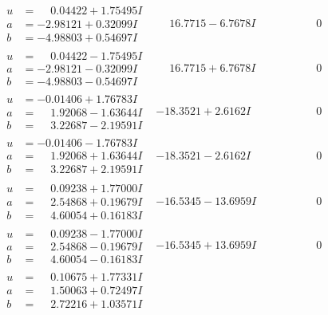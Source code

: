 \documentclass[1p]{elsarticle_modified}
\theoremstyle{definition}
\begin{document}
$$\begin{array}{c|c|c}
\begin{aligned}
u &= \phantom{-}0.04422 + 1.75495 I \\
a &= -2.98121 + 0.32099 I \\
b &= -4.98803 + 0.54697 I\end{aligned}
 & \phantom{-}16.7715 - 6.7678 I & \phantom{-0.000000 } 0 \\ \hline\begin{aligned}
u &= \phantom{-}0.04422 - 1.75495 I \\
a &= -2.98121 - 0.32099 I \\
b &= -4.98803 - 0.54697 I\end{aligned}
 & \phantom{-}16.7715 + 6.7678 I & \phantom{-0.000000 } 0 \\ \hline\begin{aligned}
u &= -0.01406 + 1.76783 I \\
a &= \phantom{-}1.92068 - 1.63644 I \\
b &= \phantom{-}3.22687 - 2.19591 I\end{aligned}
 & -18.3521 + 2.6162 I & \phantom{-0.000000 } 0 \\ \hline\begin{aligned}
u &= -0.01406 - 1.76783 I \\
a &= \phantom{-}1.92068 + 1.63644 I \\
b &= \phantom{-}3.22687 + 2.19591 I\end{aligned}
 & -18.3521 - 2.6162 I & \phantom{-0.000000 } 0 \\ \hline\begin{aligned}
u &= \phantom{-}0.09238 + 1.77000 I \\
a &= \phantom{-}2.54868 + 0.19679 I \\
b &= \phantom{-}4.60054 + 0.16183 I\end{aligned}
 & -16.5345 - 13.6959 I & \phantom{-0.000000 } 0 \\ \hline\begin{aligned}
u &= \phantom{-}0.09238 - 1.77000 I \\
a &= \phantom{-}2.54868 - 0.19679 I \\
b &= \phantom{-}4.60054 - 0.16183 I\end{aligned}
 & -16.5345 + 13.6959 I & \phantom{-0.000000 } 0 \\ \hline\begin{aligned}
u &= \phantom{-}0.10675 + 1.77331 I \\
a &= \phantom{-}1.50063 + 0.72497 I \\
b &= \phantom{-}2.72216 + 1.03571 I\end{aligned}

\end{array}$$
\end{document}
